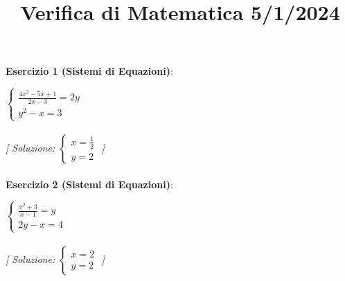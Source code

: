 \documentclass{article}
\title{\raggedright Verifica di Matematica  5/1/2024}
\date{}
\begin{document}
\maketitle

\textbf{Esercizio 1 (Sistemi di Equazioni)}:\\
\par $\begin{cases} \frac{4x^2 - 5x + 1}{2x - 3} = 2y \\ y^2 - x = 3 \end{cases}$ \\\\

\textit{[ Soluzione: $\begin{cases} x = \frac{1}{2} \\ y = 2 \end{cases}$ ]}\\\\

\textbf{Esercizio 2 (Sistemi di Equazioni)}:\\
\par $\begin{cases} \frac{x^2 + 3}{x - 1} = y \\ 2y - x = 4 \end{cases}$ \\\\

\textit{[ Soluzione: $\begin{cases} x = 2 \\ y = 2 \end{cases}$ ]}\\\\
\end{document}
